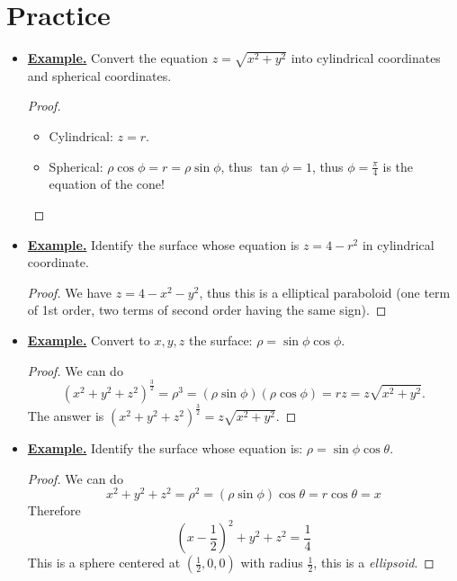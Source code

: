 \section{Practice}
\begin{itemize}

    \item \underline{\textbf{Example.}} Convert the equation $z = \sqrt{x^2+y^2}$ into cylindrical coordinates and spherical coordinates.
    \begin{proof}\quad 
        \begin{itemize}
            \item Cylindrical: $z = r$.
            \item Spherical: $\rho \cos \phi = r = \rho \sin \phi$, thus $\tan \phi = 1$, thus $\phi = \frac{\pi}{4}$ is the equation of the cone!
        \end{itemize}
    \end{proof}
    
    \item \underline{\textbf{Example.}} Identify the surface whose equation is $z = 4-r^2$ in cylindrical coordinate.
    \begin{proof}
        We have $z = 4 - x^2-y^2$, thus this is a elliptical paraboloid (one term of 1st order, two terms of second order having the same sign).
    \end{proof}

    \item \underline{\textbf{Example.}} Convert to $x,y,z$ the surface: $\rho = \sin \phi\cos \phi$.
    \begin{proof} We can do 
    \begin{equation*}
        (x^2+y^2+z^2)^\frac{3}{2}= \rho^3 = (\rho \sin \phi) (\rho\cos \phi) = rz = z\sqrt{x^2+y^2}.
    \end{equation*}
    The answer is $(x^2+y^2+z^2)^\frac{3}{2} = z\sqrt{x^2+y^2}$.
    \end{proof}

    \item \underline{\textbf{Example.}} Identify the surface whose equation is: $\rho = \sin \phi\cos \theta$.
    \begin{proof} We can do 
    \begin{equation*}
        x^2+y^2+z^2 =\rho^2 = (\rho \sin \phi) \cos \theta = r\cos\theta = x
    \end{equation*}
    Therefore 
    \begin{equation*}
        \left(x-\frac{1}{2}\right)^2 + y^2 +z^2 = \frac{1}{4}
    \end{equation*}
    This is a sphere centered at $(\frac{1}{2},0,0)$ with radius $\frac{1}{2}$, this is a \emph{ellipsoid}.
    \end{proof}
\end{itemize}
